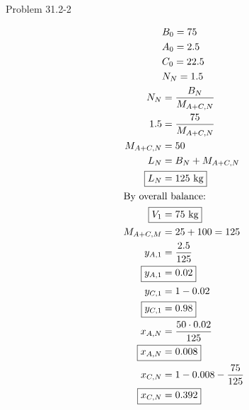 \item Problem 31.2-2

\begin{align*}
    & B_0 = 75 \\
    & A_0 = 2.5 \\
    & C_0 = 22.5 \\
    & N_N = 1.5 \\
    N_N &= \frac{B_N}{M_{A+C,N}} \\
    1.5 &= \frac{75}{M_{A+C,N}} \\
    M_{A+C,N} &= 50 \\
    L_N &= B_N + M_{A+C,N} \\
    \Aboxed{L_N &= 125 \text{ kg}} \\
    \intertext{By overall balance:}
    \Aboxed{V_1 &= 75 \text{ kg}} \\
    M_{A+C,M} &= 25 + 100 = 125 \\
    y_{A,1} &= \frac{2.5}{125} \\
    \Aboxed{y_{A,1} &= 0.02} \\
    y_{C,1} &= 1 - 0.02 \\
    \Aboxed{y_{C,1} &= 0.98} \\
    x_{A,N} &= \frac{50 \cdot 0.02}{125} \\
    \Aboxed{x_{A,N} &= 0.008} \\
    x_{C,N} &= 1 - 0.008 - \frac{75}{125} \\
    \Aboxed{x_{C,N} &= 0.392}
\end{align*}